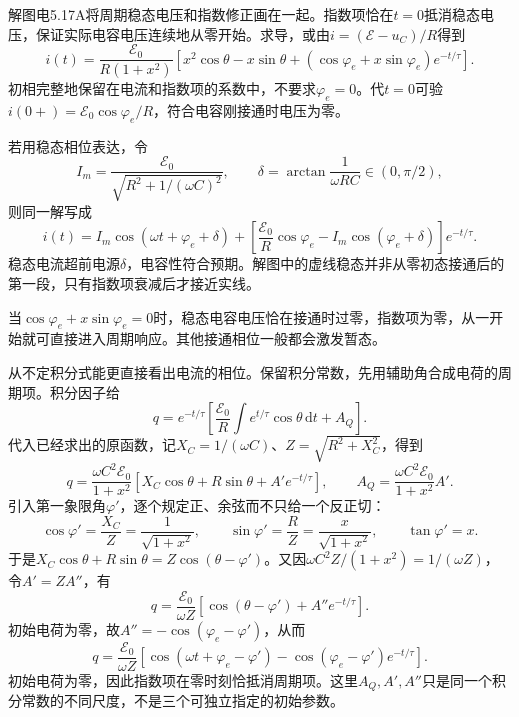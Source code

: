\documentclass[UTF8,fontset=fandol,a4paper,11pt]{ctexart}
\begin{document}
解图电5.17A将周期稳态电压和指数修正画在一起。指数项恰在$t=0$抵消稳态电压，保证实际电容电压连续地从零开始。求导，或由$i=(\mathcal E-u_C)/R$得到
\[
 \boxed{i(t)=\frac{\mathcal E_0}{R(1+x^2)}
 \left[x^2\cos\theta-x\sin\theta+
 (\cos\varphi_e+x\sin\varphi_e)e^{-t/\tau}\right].}
\]
初相完整地保留在电流和指数项的系数中，不要求$\varphi_e=0$。代$t=0$可验
$i(0+)=\mathcal E_0\cos\varphi_e/R$，符合电容刚接通时电压为零。

若用稳态相位表达，令
\[
 I_m=\frac{\mathcal E_0}{\sqrt{R^2+1/(\omega C)^2}},
 \qquad\delta=\arctan\frac1{\omega RC}\in(0,\pi/2),
\]
则同一解写成
\[
 i(t)=I_m\cos(\omega t+\varphi_e+\delta)
 +\left[\frac{\mathcal E_0}{R}\cos\varphi_e
 -I_m\cos(\varphi_e+\delta)\right]e^{-t/\tau}.
\]
稳态电流超前电源$\delta$，电容性符合预期。解图中的虚线稳态并非从零初态接通后的第一段，只有指数项衰减后才接近实线。

当$\cos\varphi_e+x\sin\varphi_e=0$时，稳态电容电压恰在接通时过零，指数项为零，从一开始就可直接进入周期响应。其他接通相位一般都会激发暂态。


从不定积分式能更直接看出电流的相位。保留积分常数，先用辅助角合成电荷的周期项。积分因子给
\[
q=e^{-t/\tau}\left[\frac{\mathcal E_0}{R}
 \int e^{t/\tau}\cos\theta\,\mathrm dt+A_Q\right].
\]
代入已经求出的原函数，记$X_C=1/(\omega C)$、$Z=\sqrt{R^2+X_C^2}$，得到
\[
q=\frac{\omega C^2\mathcal E_0}{1+x^2}
 [X_C\cos\theta+R\sin\theta+A'e^{-t/\tau}],
\qquad
A_Q=\frac{\omega C^2\mathcal E_0}{1+x^2}A'.
\]
引入第一象限角$\varphi'$，逐个规定正、余弦而不只给一个反正切：
\[
\cos\varphi'=\frac{X_C}{Z}=\frac1{\sqrt{1+x^2}},\qquad
\sin\varphi'=\frac RZ=\frac{x}{\sqrt{1+x^2}},\qquad
\tan\varphi'=x.
\]
于是$X_C\cos\theta+R\sin\theta=Z\cos(\theta-\varphi')$。又因$\omega C^2Z/(1+x^2)=1/(\omega Z)$，令$A'=ZA''$，有
\[
q=\frac{\mathcal E_0}{\omega Z}
 [\cos(\theta-\varphi')+A''e^{-t/\tau}].
\]
初始电荷为零，故$A''=-\cos(\varphi_e-\varphi')$，从而
\[
q=\frac{\mathcal E_0}{\omega Z}
 [\cos(\omega t+\varphi_e-\varphi')
 -\cos(\varphi_e-\varphi')e^{-t/\tau}].
\]
初始电荷为零，因此指数项在零时刻恰抵消周期项。这里$A_Q,A',A''$只是同一个积分常数的不同尺度，不是三个可独立指定的初始参数。
\end{document}
